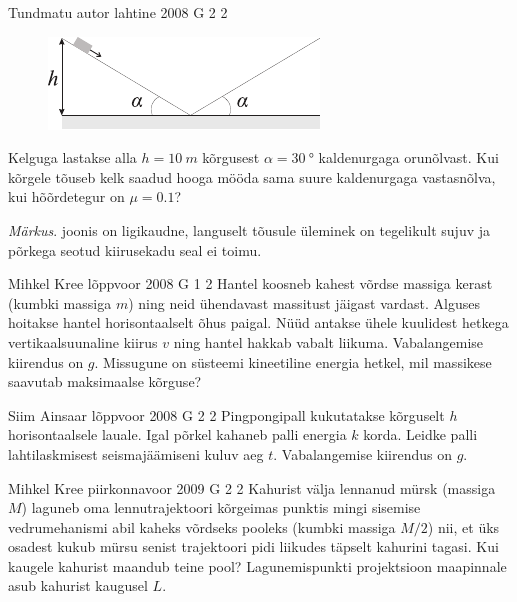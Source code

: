 \documentclass[11pt]{article}
\begin{document}
{%
{Tundmatu autor} %
{lahtine} %
{2008} %
{G 2} %
{2} %
{
\ifStatement
\begin{figure}
	\begin{center}
		\vspace{-20pt}
		\hspace{-10pt}
		\includegraphics[width=\linewidth]{2008-lahg-02-yl}
	\end{center}
\end{figure}
Kelguga lastakse alla $h = \SI{10}{m}$ kõrgusest $\alpha = \SI{30}{\degree}$ kaldenurgaga orunõlvast. Kui kõrgele tõuseb kelk saadud hooga mööda sama suure kaldenurgaga vastasnõlva, kui hõõrdetegur on $\mu = \num{0,1}$? 

\emph{Märkus}. joonis on ligikaudne, languselt tõusule üleminek on tegelikult sujuv ja põrkega seotud kiirusekadu seal ei toimu.
\fi
}

{Mihkel Kree} %
{lõppvoor} %
{2008} %
{G 1} %
{2} %
{
\ifStatement
Hantel koosneb kahest võrdse massiga kerast (kumbki massiga $m$) ning neid ühendavast massitust jäigast vardast. Alguses hoitakse hantel horisontaalselt õhus paigal. Nüüd antakse ühele kuulidest hetkega vertikaalsuunaline kiirus $v$ ning hantel hakkab vabalt liikuma. Vabalangemise kiirendus on $g$. Missugune on süsteemi kineetiline energia hetkel, mil massikese saavutab maksimaalse kõrguse?
\fi
}

{Siim Ainsaar} %
{lõppvoor} %
{2008} %
{G 2} %
{2} %
{
\ifStatement
Pingpongipall kukutatakse kõrguselt $h$ horisontaalsele lauale. Igal põrkel kahaneb palli energia $k$ korda. Leidke palli lahtilaskmisest seismajäämiseni kuluv aeg $t$. Vabalangemise kiirendus on $g$.
\fi
}

{Mihkel Kree} %
{piirkonnavoor} %
{2009} %
{G 2} %
{2} %
{
\ifStatement
Kahurist välja lennanud mürsk (massiga $M$) laguneb oma lennutrajektoori kõrgeimas punktis mingi sisemise vedrumehanismi abil kaheks võrdseks pooleks (kumbki massiga $M/2$) nii, et üks osadest kukub mürsu senist trajektoori pidi liikudes täpselt kahurini tagasi. Kui kaugele kahurist maandub teine pool? Lagunemispunkti projektsioon maapinnale asub kahurist kaugusel $L$.
\fi
}

}
\end{document}
